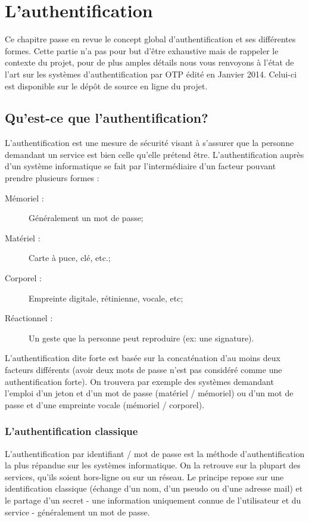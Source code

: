 \chapter{L'authentification}

	Ce chapitre passe en revue le concept global d'authentification et ses
	différentes formes. Cette partie n'a pas pour but d'être exhaustive mais
	de rappeler le contexte du projet, pour de plus amples détails nous vous
	renvoyons à l'état de l'art sur les systèmes d'authentification par OTP
	édité en Janvier 2014. Celui-ci est disponible sur le dépôt de source en
	ligne du projet.

\section{Qu'est-ce que l'authentification?}

	L'authentification est une mesure de sécurité visant à s'assurer que la
	personne demandant un service est bien celle qu'elle prétend être.
	L'authentification auprès d'un système informatique se fait par
	l'intermédiaire d'un facteur pouvant prendre plusieurs formes :

	\begin{description}
		\item[Mémoriel :] Généralement un mot de passe;
		\item[Matériel :] Carte à puce, clé, etc.;
		\item[Corporel :] Empreinte digitale, rétinienne, vocale, etc;
		\item[Réactionnel :] Un geste que la personne peut reproduire (ex: une
		signature).
	\end{description}

	L'authentification dite forte est basée sur la concaténation d'au moins
	deux facteurs différents (avoir deux mots de passe n'est pas considéré comme une
	authentification forte). On trouvera par exemple des systèmes demandant
	l'emploi d'un jeton et d'un mot de passe (matériel / mémoriel) ou d'un mot
	de passe et d'une empreinte vocale (mémoriel / corporel).

\subsection{L'authentification classique}

	L'authentification par identifiant / mot de passe est la méthode
	d'authentification la plus répandue sur les systèmes informatique. On la
	retrouve sur la plupart des services, qu'ils soient hors-ligne ou sur un
	réseau. Le principe repose sur une identification classique (échange d'un
	nom, d'un pseudo ou d'une adresse mail) et le partage d'un secret - une
	information uniquement connue de l'utilisateur et du service -
	généralement un mot de passe.


